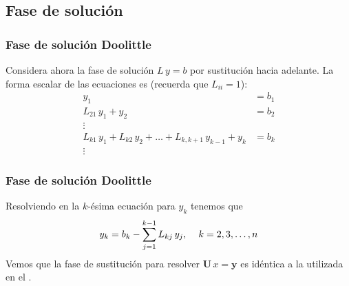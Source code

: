 \subsection{Fase de solución}
\begin{frame}
\frametitle{Fase de solución Doolittle}
Considera ahora la fase de solución $L \, y=b$ por sustitución hacia adelante. La forma escalar de las ecuaciones es (recuerda que $L_{ii}=1$):
\begin{align*}
y_{1} &= b_{1} \\
L_{21} \, y_{1} + y_{2} &=  b_{2} \\
\vdots \\
L_{k1} \, y_{1} + L_{k2} \, y_{2} + \ldots + L_{k, k+1} \, y_{k-1} + y_{k} &= b_{k} \\
\vdots
\end{align*}
\end{frame}
\begin{frame}
\frametitle{Fase de solución Doolittle}
Resolviendo en la $k$-ésima ecuación para $y_{k}$ tenemos que
\begin{align*}
y_{k} = b_{k} - \sum_{j=1}^{k-1} L_{k j} \, y_{j} , \hspace{0.4cm} k = 2, 3, \ldots, n
\end{align*}
\pause
Vemos que la fase de sustitución para resolver $\mathbf{U} \, x = \mathbf{y}$ es idéntica a la utilizada en el .
\end{frame}
